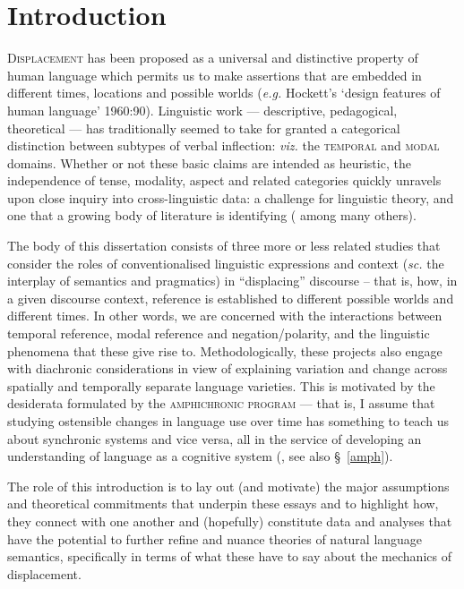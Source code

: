 \documentclass[12pt,dvipsnames]{report}
\begin{document}
\setcounter{tocdepth}{3}\tableofcontents	\gathertags
\setcounter{chapter}{0}
\setcounter{part}{0}
\reversemarginpar%
\chapter{Introduction}%
%
\label{IntroCh}
\lettrine{D}{isplacement} has been proposed as a universal and distinctive property of human language which permits us to make assertions that are embedded in different times, locations and possible worlds (\textit{e.g.} Hockett's `design features of human language' 1960:90). Linguistic work --- descriptive, pedagogical, theoretical --- has traditionally seemed to take for granted a categorical distinction between subtypes of verbal inflection: \textit{viz.} the \textsc{temporal} and \textsc{modal} domains. Whether or not these basic claims are intended as heuristic, the independence of tense, modality, aspect and related categories quickly unravels upon close inquiry into cross-linguistic data: a challenge for linguistic theory, and one that a growing body of literature is identifying (\citealp[\textit{e.g.},][]{Condoravdi2002,Laca2012,Hacquard2006,Rullmann2018} among many others).


The body of this dissertation consists of three more or less related studies that consider the roles of conventionalised linguistic expressions and context (\textit{sc.} the interplay of semantics and pragmatics) in ``displacing'' discourse -- that is, how, in a given discourse context, reference is established to different possible worlds and different times. In other words, we are concerned with the interactions between temporal reference, modal reference and negation/polarity, and the linguistic phenomena that these give rise to. Methodologically, these projects also engage with diachronic considerations in view of explaining variation and change across spatially and temporally separate language varieties. This is motivated by the desiderata formulated by the \textsc{amphichronic program} --- that is, I assume that studying ostensible changes in language use over time has something to teach us about synchronic systems and vice versa, all in the service of developing an understanding of language as a cognitive system (\citealp[\textit{e.g.},][]{Kiparsky2006,Deo2015,Anderson2016a}, see also \S~\ref{amph}).

The role of this introduction is to lay out (and motivate) the major assumptions and theoretical commitments that underpin these essays and to highlight how, they connect with one another and (hopefully) constitute data and analyses that have the potential to further refine and nuance theories of natural language semantics, specifically in terms of what these have to say about the mechanics of displacement.
\end{document}
